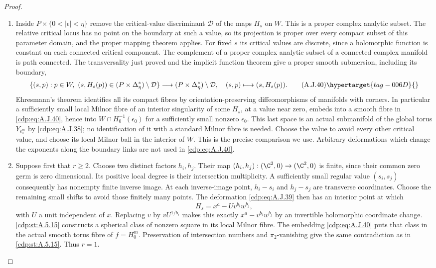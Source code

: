 \begin{proof}
\begin{enumerate}[label={$\langle1\rangle$\arabic*.},leftmargin=*]
\item Inside $P\times\{0<|\epsilon|<\eta\}$ remove the
critical-value discriminant $\mathcal D$ of the
maps $H_s$ on $W$. This is a proper complex
analytic subset. The relative critical locus has
no point on the boundary at such a value, so its
projection is proper over every compact subset
of this parameter domain, and the proper mapping
theorem applies. For fixed $s$ its critical
values are discrete, since a holomorphic function
is constant on each connected critical component.
The complement of a proper complex analytic
subset of a connected complex manifold is path
connected. The transversality just proved and
the implicit function theorem give a proper
smooth submersion, including its boundary,
\[
 \{(s,p):p\in W,\ (s,H_s(p))\in
                    (P\times\Delta_\eta^*)\setminus\mathcal D\}
 \longrightarrow
       (P\times\Delta_\eta^*)\setminus\mathcal D,
 \quad (s,p)\longmapsto(s,H_s(p)).                 \tag{A.J.40}\hypertarget{tag-006D}{}\label{cdp:eq:A.J.40}
\]
Ehresmann's theorem identifies all its compact
fibres by orientation-preserving diffeomorphisms
of manifolds with corners.
In particular a sufficiently small local Milnor
fibre of an interior singularity of some $H_s$,
at a value near zero, embeds into a smooth fibre
in \eqref{cdp:eq:A.J.40}, hence into
$W\cap H_0^{-1}(\epsilon_0)$ for a sufficiently
small nonzero $\epsilon_0$. This last space is
an actual submanifold of the global torus
$Y_{\epsilon_0^m}$ by \eqref{cdp:eq:A.J.38}; no identification
of it with a standard Milnor fibre is needed.
Choose the value to avoid every other
critical value, and choose its local Milnor ball
in the interior of $W$. This is the precise
comparison we use. Arbitrary deformations which
change the exponents along the boundary links
are not used in \eqref{cdp:eq:A.J.40}.

\item Suppose first that $r\ge2$. Choose two distinct
factors $h_i,h_j$. Their map
$(h_i,h_j):(\C^2,0)\to(\C^2,0)$ is finite,
since their common zero germ is zero dimensional.
Its positive local degree is their intersection
multiplicity. A sufficiently small regular value
$(s_i,s_j)$ consequently has nonempty finite
inverse image. At each inverse-image point,
$h_i-s_i$ and $h_j-s_j$ are transverse coordinates.
Choose the remaining small shifts to avoid those
finitely many points. The deformation \eqref{cdp:eq:A.J.39}
then has an interior point at which
\[
            H_s=x^a-U v^{b_i}w^{b_j},
\]
with $U$ a unit independent of $x$. Replacing
$v$ by $vU^{1/b_i}$ makes this exactly
$x^a-v^{b_i}w^{b_j}$ by an invertible holomorphic
coordinate change. \ref{cdp:st:A.5.15} constructs a spherical
class of nonzero square in its local Milnor fibre.
The embedding \eqref{cdp:eq:A.J.40} puts that class in the
actual smooth torus fibre of $f=H_0^m$.
Preservation of intersection
numbers and $\pi_2$-vanishing give the same
contradiction as in \ref{cdp:st:A.5.15}. Thus $r=1$.


\end{enumerate}
\end{proof}

